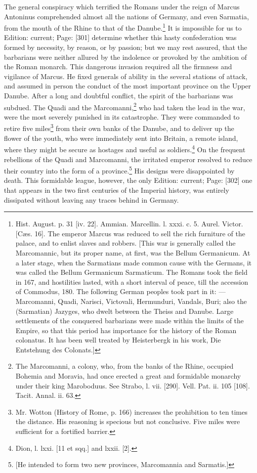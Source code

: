 The general conspiracy which terrified the Romans under the reign of Marcus Antoninus comprehended almost all the nations of Germany, and even Sarmatia, from the mouth of the Rhine to that of the Danube.\footnote{Hist. August. p. 31 [iv. 22]. Ammian. Marcellin. l. xxxi. c. 5. Aurel. Victor. [Cæs. 16]. The emperor Marcus was reduced to sell the rich furniture of the palace, and to enlist slaves and robbers. [This war is generally called the Marcomannic, but its proper name, at first, was the Bellum Germanicum. At a later stage, when the Sarmatians made common cause with the Germans, it was called the Bellum Germanicum Sarmaticum. The Romans took the field in 167, and hostilities lasted, with a short interval of peace, till the accession of Commodus, 180. The following German peoples took part in it: \texthebrew{—} Marcomanni, Quadi, Narisci, Victovali, Hermunduri, Vandals, Buri; also the (Sarmatian) Jazyges, who dwelt between the Theiss and Danube. Large settlements of the conquered barbarians were made within the limits of the Empire, so that this period has importance for the history of the Roman colonatus. It has been well treated by Heisterbergk in his work, Die Entstehung des Colonats.]} It is impossible for us to Edition: current; Page: [301] determine whether this hasty confederation was formed by necessity, by reason, or by passion; but we may rest assured, that the barbarians were neither allured by the indolence or provoked by the ambition of the Roman monarch. This dangerous invasion required all the firmness and vigilance of Marcus. He fixed generals of ability in the several stations of attack, and assumed in person the conduct of the most important province on the Upper Danube. After a long and doubtful conflict, the spirit of the barbarians was subdued. The Quadi and the Marcomanni,\footnote{The Marcomanni, a colony, who, from the banks of the Rhine, occupied Bohemia and Moravia, had once erected a great and formidable monarchy under their king Maroboduus. See Strabo, l. vii. [290]. Vell. Pat. ii. 105 [108]. Tacit. Annal. ii. 63.} who had taken the lead in the war, were the most severely punished in its catastrophe. They were commanded to retire five miles\footnote{Mr. Wotton (History of Rome, p. 166) increases the prohibition to ten times the distance. His reasoning is specious but not conclusive. Five miles were sufficient for a fortified barrier.} from their own banks of the Danube, and to deliver up the flower of the youth, who were immediately sent into Britain, a remote island, where they might be secure as hostages and useful as soldiers.\footnote{Dion, l. lxxi. [11 et sqq.] and lxxii. [2].} On the frequent rebellions of the Quadi and Marcomanni, the irritated emperor resolved to reduce their country into the form of a province.\footnote{[He intended to form two new provinces, Marcomannia and Sarmatis.]} His designs were disappointed by death. This formidable league, however, the only Edition: current; Page: [302] one that appears in the two first centuries of the Imperial history, was entirely dissipated without leaving any traces behind in Germany.


